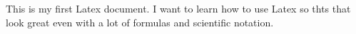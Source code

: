 \documentclass{article}
\begin{document}
This is my first Latex document. I want to learn how to use Latex so thts that look great even with a lot of formulas and scientific notation.
\end{document}
